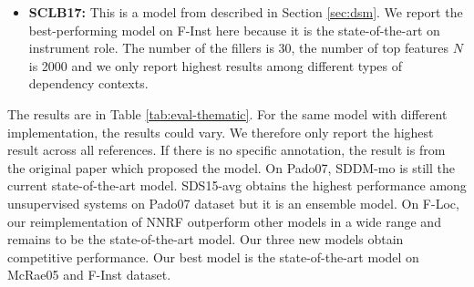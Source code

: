 \documentclass[a4paper]{article}
\begin{document}
\begin{itemize}
  \item \textbf{SCLB17: }   This is a model from \citet{santus2017measuring} described in Section \ref{sec:dsm}. We report the  best-performing model on F-Inst here because it is the state-of-the-art on instrument role. The number of the fillers is 30, the number of top features $N$ is 2000 and we only report highest results among different types of dependency contexts. 
\end{itemize}

The results are in Table \ref{tab:eval-thematic}. For the same model with different implementation, the results could vary. We therefore only report the highest result across all references. If there is no specific annotation, the result is from the original paper which proposed the model. On Pado07, SDDM-mo is still the current state-of-the-art model. SDS15-avg obtains the highest performance among unsupervised systems on Pado07 dataset but it is an ensemble model. On F-Loc, our reimplementation of NNRF outperform other models in a wide range and remains to be the state-of-the-art model. Our three new models obtain competitive performance. Our best model is the state-of-the-art model on McRae05 and F-Inst dataset. 
\end{document}
